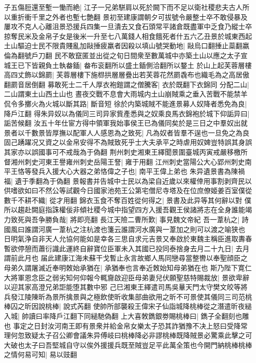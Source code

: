 子五傷脰還至塹一慟而絶|{
	江子一兄弟駢肩以死於闕下而不足以衛社稷悲夫古人所以重折衝千里之外者也塹七艶翻}
景初至建康謂朝夕可拔號令嚴整士卒不敢侵暴及屢攻不克人心離沮景恐援兵四集一旦潰去又食石頭常平諸倉既盡軍中乏食乃縱士卒掠奪民米及金帛子女是後米一升至七八萬錢人相食餓死者什五六乙丑景於城東西起土山驅迫士民不限貴賤亂加敺捶疲羸者因殺以填山號哭動地|{
	敺烏口翻捶止蘂翻羸倫為翻號戶刀翻}
民不敢竄匿並出從之旬日間衆至數萬城中亦築土山以應之太子宣城王已下皆親負土執畚鍤|{
	畚布衮翻所以盛土鍤側洽翻所以鍪土}
於山上起芙蓉層樓高四丈飾以錦罽|{
	芙蓉層樓下施㭿拱層層疊出若芙蓉花然罽毳布也織毛為之高居傲翻罽音居倒翻}
募敢死士二千人厚衣袍鎧謂之僧騰客|{
	衣於既翻下衣錦同}
分配二山|{
	二山謂東土山西土山也}
晝夜交戰不息會大雨城内土山崩賊乘之垂入苦戰不能禁羊侃令多擲火為火城以斷其路|{
	斷音短}
徐於内築城賊不能進景募人奴降者悉免為良|{
	降戶江翻}
得朱异奴以為儀同三司异家貲產悉與之奴乘良馬衣錦袍於城下仰詬异曰|{
	詬苦候翻}
汝五十年仕宦方得中領軍我始事侯王已為儀同矣於是三日之中羣奴出就景者以千數景皆厚撫以配軍人人感恩為之致死|{
	凡為奴者皆羣不逞也一旦免之為良固己踴躍况又資之以金帛安得不為賊致死乎士大夫承平之時虐用奴婢豈特誤其身誤其家亦以誤國事可不戒哉為于偽翻}
荆州刺史湘東王繹聞景圍臺城丙寅戒嚴移檄所督湘州刺史河東王譽雍州刺史岳陽王詧|{
	雍于用翻}
江州刺史當陽公大心郢州刺史南平王恪等發兵入援大心大器之弟恪偉之子也|{
	南平王偉上弟也}
朱异遺景書為陳禍福|{
	遺于季翻為于偽翻}
景報書并告城中士民以為梁自近歲以來權倖用事割剥齊民以供嗜欲如曰不然公等試觀今日國家池苑王公第宅僧尼寺塔及在位庶僚姬姜百室僕從數千不耕不織|{
	從才用翻}
錦衣玉食不奪百姓從何得之|{
	景書及此异等其何辭以對}
僕所以趨赴闕庭指誅權佞非傾社稷今城中指望四方入援吾觀王侯諸將志在全身誰能竭力致死與吾争勝負哉|{
	將即亮翻}
長江天險二曹所歎|{
	事見魏文帝紀}
吾一葦杭之|{
	詩國風曰誰謂河廣一葦杭之注杭渡也箋云誰謂河水廣與一葦加之則可以渡之喻狭也}
日明氣浄自非天人允協何能如是幸各三思自求元吉景又奉啟於東魏主稱臣進取夀春暫欲停憩而蕭衍識此運終自辭寶位臣軍未入其國已投同泰捨身去月二十九日|{
	去月謂前此月也}
届此建康江海未蘇干戈暫止永言故鄉人馬同戀尋當整轡以奉聖顔臣之母弟久謂屠滅近奉明敇始承猶在|{
	承猶奉也言奉近敇始知母弟猶在也}
斯乃陛下寛仁大將軍恩念臣之弱劣知何仰報今輒齎啟迎臣母弟妻兒伏願聖慈特賜裁放|{
	景欲卑辭以迎其家高澄兄弟詎能堕其數中邪}
己巳湘東王繹遣司馬吳曅天門太守樊文皎等將兵發江陵陳昕為景所擒景與之極飲使昕收集部曲欲用之昕不可景使其儀同三司范桃棒囚之昕因說桃棒|{
	說式芮翻}
使帥所部襲殺王偉宋子仙詣城降桃棒從之潛遣昕夜縋入城|{
	帥讀曰率降戶江翻下同縋馳偽翻}
上大喜敇鐫銀劵賜桃棒曰|{
	鐫子全翻刻也雕也}
事定之日封汝河南王即有景衆并給金帛女樂太子恐其詐猶豫不决上怒曰受降常理何忽致疑太子召公卿會議朱异傅岐曰桃棒降必非謬桃棒既降賊景必驚乘此擊之可大破也太子曰吾堅城自守以俟外援援兵既至賊豈足平此萬全策也今開門納桃棒桃棒之情何易可知|{
	易以豉翻}
